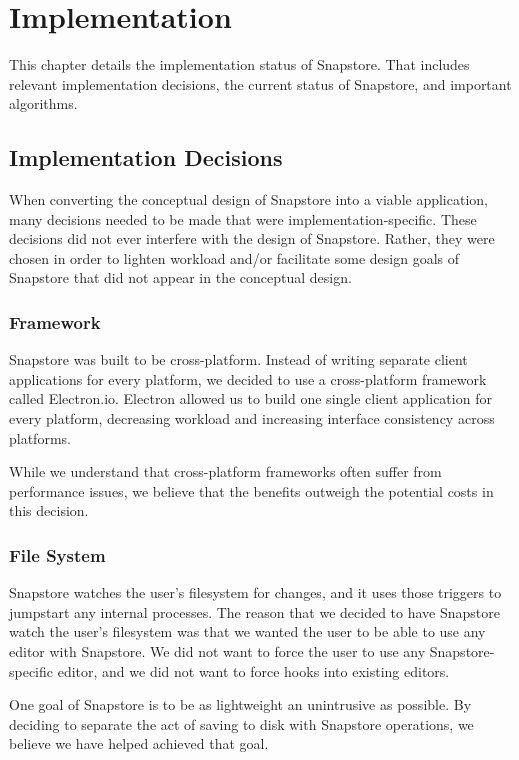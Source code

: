 \chapter{Implementation}

This chapter details the implementation status of Snapstore. That includes relevant implementation decisions, the current status of Snapstore, and important algorithms.

\section{Implementation Decisions}

When converting the conceptual design of Snapstore into a viable application, many decisions needed to be made that were implementation-specific. These decisions did not ever interfere with the design of Snapstore. Rather, they were chosen in order to lighten workload and/or facilitate some design goals of Snapstore that did not appear in the conceptual design.

\subsection{Framework}

Snapstore was built to be cross-platform. Instead of writing separate client applications for every platform, we decided to use a cross-platform framework called Electron.io. Electron allowed us to build one single client application for every platform, decreasing workload and increasing interface consistency across platforms.

While we understand that cross-platform frameworks often suffer from performance issues, we believe that the benefits outweigh the potential costs in this decision.

\subsection{File System}

Snapstore watches the user's filesystem for changes, and it uses those triggers to jumpstart any internal processes. The reason that we decided to have Snapstore watch the user's filesystem was that we wanted the user to be able to use any editor with Snapstore. We did not want to force the user to use any Snapstore-specific editor, and we did not want to force hooks into existing editors.

One goal of Snapstore is to be as lightweight an unintrusive as possible. By deciding to separate the act of saving to disk with Snapstore operations, we believe we have helped achieved that goal.


